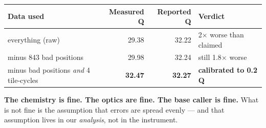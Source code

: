 \begin{dobox}[title={Once the two faults are removed, our quality scores are excellent}]
\begin{center}\small
\begin{tabular}{@{}l r r l@{}}
\toprule
\rowcolor{bio!13}
\textbf{Data used} & \textbf{Measured Q} & \textbf{Reported Q} & \textbf{Verdict}\\
\midrule
everything (raw) & 29.38 & 32.22 & 2$\times$ worse than claimed\\
minus 843 bad positions & 29.98 & 32.24 & still 1.8$\times$ worse\\
\rowcolor{bio!8}
minus bad positions \emph{and} 4 tile-cycles & \textbf{32.47} & \textbf{32.27} & \textbf{calibrated to 0.2 Q}\\
\bottomrule
\end{tabular}
\end{center}
\vspace{3pt}
\textbf{The chemistry is fine. The optics are fine. The base caller is fine.} What is not fine is the
assumption that errors are spread evenly --- and that assumption lives in our \emph{analysis}, not in
the instrument.
\end{dobox}
